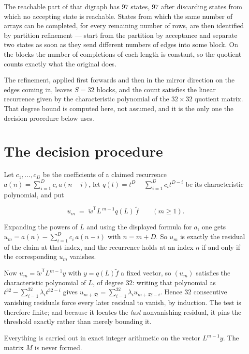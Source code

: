 \documentclass[11pt]{article}
\theoremstyle{definition}
\begin{document}
The reachable part of that digraph has $97$ states, $97$ after discarding states from which no accepting state is reachable. States from which the same number of arrays can be completed, for every remaining number of rows, are then identified by partition refinement --- start from the partition by acceptance and separate two states as soon as they send different numbers of edges into some block. On the blocks the number of completions of each length is constant, so the quotient counts exactly what the original does.

The refinement, applied first forwards and then in the mirror direction on the edges coming in, leaves $S = 32$ blocks, and the count satisfies the linear recurrence given by the characteristic polynomial of the $32 \times 32$ quotient matrix. That degree bound is computed here, not assumed, and it is the only one the decision procedure below uses.

\section{The decision procedure}

Let $c_1,\dots,c_D$ be the coefficients of a claimed recurrence $a(n) = \sum_{i=1}^{D} c_i\,a(n-i)$, let $q(t) = t^{D} - \sum_{i=1}^{D} c_i t^{D-i}$ be its characteristic polynomial, and put

\[u_m \;=\; \tilde w^{\mathsf T} L^{\,m-1} q(L)\,\tilde f \qquad (m \ge 1).\]

Expanding the powers of $L$ and using the displayed formula for $a$, one gets $u_m = a(n) - \sum_{i=1}^{D} c_i\,a(n-i)$ with $n = m + D$. So $u_m$ is exactly the residual of the claim at that index, and the recurrence holds at an index $n$ if and only if the corresponding $u_m$ vanishes.

Now $u_m = \tilde w^{\mathsf T} L^{m-1} y$ with $y = q(L)\tilde f$ a fixed vector, so $(u_m)$ satisfies the characteristic polynomial of $L$, of degree $32$: writing that polynomial as $t^{32} - \sum_{i=1}^{32} \lambda_i t^{32-i}$ gives $u_{m+32} = \sum_{i=1}^{32} \lambda_i u_{m+32-i}$. Hence $32$ consecutive vanishing residuals force every later residual to vanish, by induction. The test is therefore finite; and because it locates the {\itshape last} nonvanishing residual, it pins the threshold exactly rather than merely bounding it.

Everything is carried out in exact integer arithmetic on the vector $L^{m-1}y$. The matrix $M$ is never formed.
\end{document}
